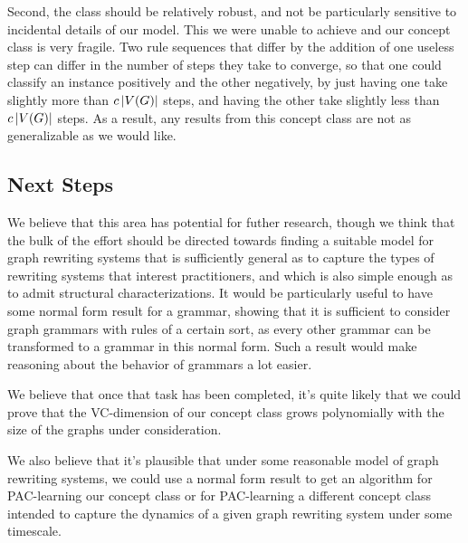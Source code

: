 \documentclass[]{article}
\begin{document}
Second, the class should be relatively robust, and not be
particularly sensitive to incidental details of our model. This we were unable
to achieve and our concept class is very fragile. Two rule sequences that
differ by the addition of one useless step can differ in the number of steps
they take to converge, so that one could classify an instance positively and the
other negatively, by just having one take slightly more than $c\left| V(G) \right|$
steps, and having the other take slightly less than $c\left| V(G) \right|$ steps. As a
result, any results from this concept class are not as generalizable as we
would like.

\subsection{Next Steps}

We believe that this area has potential for futher research, though we think
that the bulk of the effort should be directed towards finding a suitable model
for graph rewriting systems that is sufficiently general as to capture the types
of rewriting systems that interest practitioners, and which is also simple
enough as to admit structural characterizations. It would be particularly useful
to have some normal form result for a grammar, showing that it is sufficient to
consider graph grammars with rules of a certain sort, as every other grammar can
be transformed to a grammar in this normal form. Such a result would make
reasoning about the behavior of grammars a lot easier.

We believe that once that task has been completed, it's quite likely that we
could prove that the VC-dimension of our concept class grows polynomially with
the size of the graphs under consideration.

We also believe that it's plausible that under some reasonable model of graph
rewriting systems, we could use a normal form result to get an algorithm for
PAC-learning our concept class or for PAC-learning a different concept class
intended to capture the dynamics of a given graph rewriting system under some
timescale.



\end{document}
